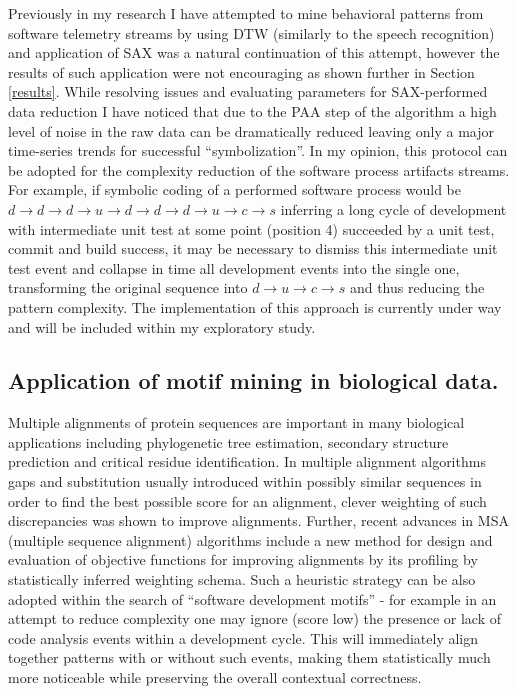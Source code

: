 \documentclass{sig-alternate}
\begin{document}
Previously in my research I have attempted to mine behavioral patterns from software telemetry streams by using DTW (similarly to the speech recognition) and application of SAX was a natural continuation of this attempt, however the results of such application were not encouraging as shown further in Section \ref{results}. While resolving issues and evaluating parameters for SAX-performed data reduction I have noticed that due to the PAA step of the algorithm a high level of noise in the raw data can be dramatically reduced  leaving only a major time-series trends for successful ``symbolization''. In my opinion, this protocol can be adopted for the complexity reduction of the software process artifacts streams. For example, if symbolic coding of a performed software process would be $d \rightarrow d \rightarrow d \rightarrow u \rightarrow d \rightarrow d \rightarrow d \rightarrow u \rightarrow c \rightarrow s $ inferring a long cycle of development with intermediate unit test at some point (position 4) succeeded by a unit test, commit and build success, it may be necessary to dismiss this intermediate unit test event and collapse in time all development events into the single one, transforming the original sequence into $d \rightarrow u \rightarrow c \rightarrow s $ and thus reducing the pattern complexity. The implementation of this approach is currently under way and will be included within my exploratory study.

\subsection{Application of motif mining in biological data.}
Multiple alignments of protein sequences are important in many biological applications including phylogenetic tree estimation, secondary structure prediction and critical residue identification. In multiple alignment algorithms gaps and substitution usually introduced within possibly similar sequences in order to find the best possible score for an alignment, clever weighting of such discrepancies was shown to improve alignments. Further, recent advances in MSA (multiple sequence alignment) algorithms \cite{citeulike:692} include a new method for design and evaluation of objective functions for improving alignments by its profiling by statistically inferred weighting schema. Such a heuristic strategy can be also adopted within the search of ``software development motifs'' - for example in an attempt to reduce complexity one may ignore (score low) the presence or lack of code analysis events within a development cycle. This will immediately align together patterns with or without such events, making them statistically much more noticeable while preserving the overall contextual correctness.
\end{document}

